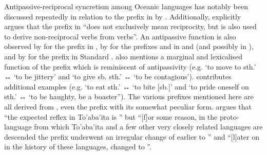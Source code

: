 Antipassive-reciprocal syncretism among Oceanic languages has notably been discussed repeatedly in relation to the prefix  in  by \citet{lichtenberk:1991, lichtenberk:2000, lichtenberk:2007}. Additionally, \citet[147, 156]{mosel:1984} explicitly argues that the prefix  in  “does not exclusively mean reciprocity, but is also used to derive non-reciprocal  verbs from  verbs”. An antipassive function is also observed by \citet[137f.]{davis:2003} for the prefix  in , by \citet[37f.]{bril:2005} for the prefixes  and  in  and  (and possibly in ), and by \citet[164]{janic:2016} for the prefix  in Standard . \citet[33, 39]{bril:2005} also mentions a marginal and lexicalised function of the  prefix  which is reminiscent of antipassivity (e.g.  ‘to move to sth.’ ↔  ‘to be jittery’ and  ‘to give sb. sth.’ ↔  ‘to be contagious’). \citet[1047]{moyse-faurie:2015} contributes additional examples (e.g.  ‘to eat sth.’ ↔  ‘to bite [sb.]’ and  ‘to pride oneself on sth.’ ↔  ‘to be haughty, be a boaster”). The various prefixes mentioned here are all derived from  , even the  prefix with its somewhat peculiar form. \citet[1566f.]{lichtenberk:2007} argues that “the expected reflex in To’aba’ita is ” but “[f]or some reason, in the proto-language from which To’aba’ita and a few other very closely related languages are descended the prefix underwent an irregular change of earlier  to ” and “[l]ater on in the history of these languages,  changed to ”.

